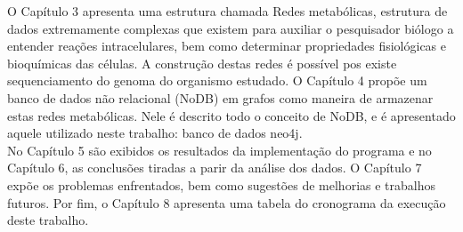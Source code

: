 \indent O Capítulo 3 apresenta uma estrutura chamada Redes metabólicas, estrutura de dados extremamente complexas que existem para auxiliar o pesquisador biólogo a entender reações intracelulares, bem como determinar propriedades fisiológicas e bioquímicas das células. A construção destas redes é possível pos existe sequenciamento do genoma do organismo estudado. O Capítulo 4 propõe um banco de dados não relacional (NoDB) em grafos como maneira de armazenar estas redes metabólicas. Nele é descrito todo o conceito de NoDB, e é apresentado aquele utilizado neste trabalho: banco de dados neo4j. \\

\indent No Capítulo 5 são exibidos os resultados da implementação do programa e no Capítulo 6, as conclusões tiradas a parir da análise dos dados. O Capítulo 7 expõe os problemas enfrentados, bem como sugestões de melhorias e trabalhos futuros. Por fim, o Capítulo 8 apresenta uma tabela do cronograma da execução deste trabalho.






